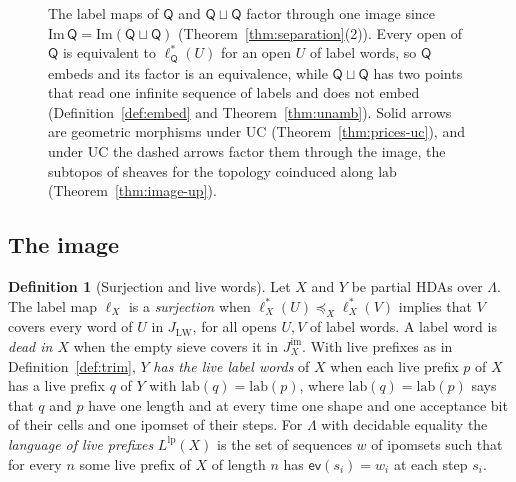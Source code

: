\documentclass{lmcs}
\theoremstyle{definition}
\newtheorem{definition}[theorem]{Definition}
\theoremstyle{remark}
\newcommand{\Ee}{\mathcal{E}}
\newcommand{\Sh}{\mathbf{Sh}}
\newcommand{\ip}{\mathsf{ev}}
\newcommand{\prin}[1]{\mathrm{#1}}
\newcommand{\UC}{\prin{UC}}
\newcommand{\JLW}{J_{\LW}}
\newcommand{\fle}[1]{\preceq_{#1}}
\newcommand{\lab}{\mathrm{lab}}
\newcommand{\LW}{\mathrm{LW}}
\providecommand{\dsum}{\sqcup}
\providecommand{\LangLp}[1]{L^{\mathrm{lp}}(#1)}
\providecommand{\wQ}{\mathsf{Q}}
\providecommand{\lab}{\mathrm{lab}}
\providecommand{\BL}{\mathcal{B}_{\Lambda}}
\providecommand{\lst}[1]{\ell^{*}_{#1}}
\providecommand{\Ima}{\mathrm{Im}}
\providecommand{\Jim}[1]{J^{\mathrm{im}}_{#1}}
\providecommand{\dsum}{\sqcup}
\providecommand{\wQ}{\mathsf{Q}}
\begin{document}
\begin{figure}[htb]
\centering
{}
\caption{The label maps of $\wQ$ and $\wQ\dsum \wQ$ factor through one image since $\Ima\,\wQ=\Ima(\wQ\dsum \wQ)$
(Theorem~\ref{thm:separation}(2)). Every open of $\wQ$ is equivalent to $\lst{\wQ}(U)$ for an open $U$ of label words, so $\wQ$ embeds and its factor is an
equivalence, while $\wQ\dsum \wQ$ has two points that read one infinite sequence of labels and does not embed (Definition~\ref{def:embed} and
Theorem~\ref{thm:unamb}). Solid arrows are geometric morphisms under $\UC$ (Theorem~\ref{thm:prices-uc}), and under $\UC$ the dashed arrows factor them through the image, the subtopos of sheaves for the topology coinduced along $\lab$
\cite{Caramello19} (Theorem~\ref{thm:image-up}).}
\label{fig:embed}
\end{figure}

\subsection{The image}\label{ssec:image-image}

\begin{definition}[Surjection and live words]\label{def:fibres-live}\label{def:image-lp}
Let $X$ and $Y$ be partial HDAs over $\Lambda$. The label map $\ell_X$ is a \emph{surjection} when
$\lst{X}(U)\fle{X}\lst{X}(V)$ implies that $V$ covers every word of $U$ in $\JLW$, for all opens $U,V$ of label
words. A label word is \emph{dead in $X$} when the empty sieve covers it
in $\Jim{X}$. With live prefixes as in Definition~\ref{def:trim}, $Y$ \emph{has the live label
words} of $X$ when each live prefix $p$ of $X$ has a live prefix $q$ of $Y$ with $\lab(q)=\lab(p)$, where $\lab(q)=\lab(p)$ says that $q$ and $p$ have one length and at every time one shape and one acceptance bit
of their cells and one ipomset of their steps. For $\Lambda$ with
decidable equality the \emph{language of live prefixes} $\LangLp{X}$ is the set of sequences $w$ of ipomsets such
that for every $n$ some live prefix of $X$ of length $n$ has $\ip(s_i)=w_i$ at each step
$s_i$.
\end{definition}
\end{document}
